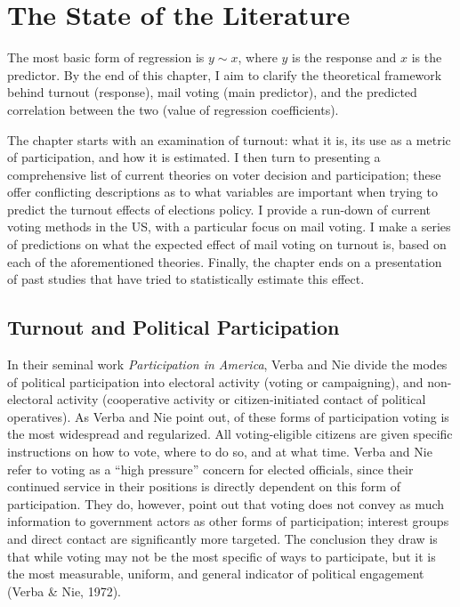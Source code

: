 \documentclass[12pt,twoside]{reedthesis}
\begin{document}
  \chapter{The State of the Literature}\label{rmd-basics}
  
  The most basic form of regression is \(y\sim x\), where \(y\) is the
  response and \(x\) is the predictor. By the end of this chapter, I aim
  to clarify the theoretical framework behind turnout (response), mail
  voting (main predictor), and the predicted correlation between the two
  (value of regression coefficients).
  
  The chapter starts with an examination of turnout: what it is, its use
  as a metric of participation, and how it is estimated. I then turn to
  presenting a comprehensive list of current theories on voter decision
  and participation; these offer conflicting descriptions as to what
  variables are important when trying to predict the turnout effects of
  elections policy. I provide a run-down of current voting methods in the
  US, with a particular focus on mail voting. I make a series of
  predictions on what the expected effect of mail voting on turnout is,
  based on each of the aforementioned theories. Finally, the chapter ends
  on a presentation of past studies that have tried to statistically
  estimate this effect.
  
  \section{Turnout and Political
  Participation}\label{turnout-and-political-participation}
  
  In their seminal work \emph{Participation in America}, Verba and Nie
  divide the modes of political participation into electoral activity
  (voting or campaigning), and non-electoral activity (cooperative
  activity or citizen-initiated contact of political operatives). As Verba
  and Nie point out, of these forms of participation voting is the most
  widespread and regularized. All voting-eligible citizens are given
  specific instructions on how to vote, where to do so, and at what time.
  Verba and Nie refer to voting as a ``high pressure'' concern for elected
  officials, since their continued service in their positions is directly
  dependent on this form of participation. They do, however, point out
  that voting does not convey as much information to government actors as
  other forms of participation; interest groups and direct contact are
  significantly more targeted. The conclusion they draw is that while
  voting may not be the most specific of ways to participate, but it is
  the most measurable, uniform, and general indicator of political
  engagement (Verba \& Nie, 1972).
  
\end{document}
